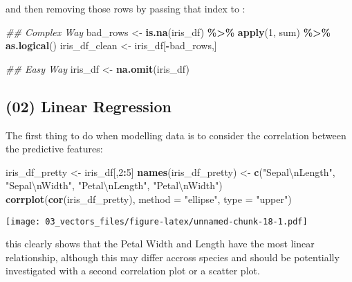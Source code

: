 \documentclass[
]{article}
\newenvironment{Shaded}{\begin{snugshade}}{\end{snugshade}}
\newcommand{\CharTok}[1]{\textcolor[rgb]{0.31,0.60,0.02}{#1}}
\newcommand{\CommentTok}[1]{\textcolor[rgb]{0.56,0.35,0.01}{\textit{#1}}}
\newcommand{\DataTypeTok}[1]{\textcolor[rgb]{0.13,0.29,0.53}{#1}}
\newcommand{\DecValTok}[1]{\textcolor[rgb]{0.00,0.00,0.81}{#1}}
\newcommand{\KeywordTok}[1]{\textcolor[rgb]{0.13,0.29,0.53}{\textbf{#1}}}
\newcommand{\NormalTok}[1]{#1}
\newcommand{\OperatorTok}[1]{\textcolor[rgb]{0.81,0.36,0.00}{\textbf{#1}}}
\newcommand{\StringTok}[1]{\textcolor[rgb]{0.31,0.60,0.02}{#1}}
\begin{document}
and then removing those rows by passing that index to :

\begin{Shaded}
\begin{Highlighting}[]
\CommentTok{\#\# Complex Way}
\NormalTok{bad\_rows <{-}}\StringTok{ }\KeywordTok{is.na}\NormalTok{(iris\_df) }\OperatorTok{\%>\%}\StringTok{ }\KeywordTok{apply}\NormalTok{(}\DecValTok{1}\NormalTok{, sum) }\OperatorTok{\%>\%}\StringTok{ }\KeywordTok{as.logical}\NormalTok{()}
\NormalTok{iris\_df\_clean <{-}}\StringTok{ }\NormalTok{iris\_df[}\OperatorTok{{-}}\NormalTok{bad\_rows,]}

\CommentTok{\#\# Easy Way}
\NormalTok{iris\_df <{-}}\StringTok{ }\KeywordTok{na.omit}\NormalTok{(iris\_df)}
\end{Highlighting}
\end{Shaded}

\hypertarget{linear-regression}{%
\subsection{(02) Linear Regression}\label{linear-regression}}

The first thing to do when modelling data is to consider the correlation
between the predictive features:

\begin{Shaded}
\begin{Highlighting}[]
\NormalTok{iris\_df\_pretty <{-}}\StringTok{ }\NormalTok{iris\_df[,}\DecValTok{2}\OperatorTok{:}\DecValTok{5}\NormalTok{]}
\KeywordTok{names}\NormalTok{(iris\_df\_pretty) <{-}}\StringTok{ }\KeywordTok{c}\NormalTok{(}\StringTok{"Sepal}\CharTok{\textbackslash{}n}\StringTok{Length"}\NormalTok{, }\StringTok{"Sepal}\CharTok{\textbackslash{}n}\StringTok{Width"}\NormalTok{, }\StringTok{"Petal}\CharTok{\textbackslash{}n}\StringTok{Length"}\NormalTok{, }\StringTok{"Petal}\CharTok{\textbackslash{}n}\StringTok{Width"}\NormalTok{)}
\KeywordTok{corrplot}\NormalTok{(}\KeywordTok{cor}\NormalTok{(iris\_df\_pretty), }\DataTypeTok{method =} \StringTok{"ellipse"}\NormalTok{, }\DataTypeTok{type =} \StringTok{"upper"}\NormalTok{)}
\end{Highlighting}
\end{Shaded}

\texttt{[image: 03\_vectors\_files/figure-latex/unnamed-chunk-18-1.pdf]}

this clearly shows that the Petal Width and Length have the most linear
relationship, although this may differ accross species and should be
potentially investigated with a second correlation plot or a scatter
plot.
\end{document}
